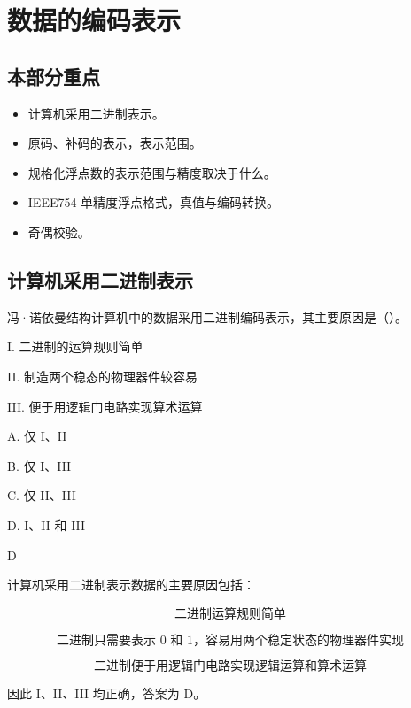 \section{数据的编码表示}

\subsection*{本部分重点}
\begin{itemize}
    \item 计算机采用二进制表示。
    \item 原码、补码的表示，表示范围。
    \item 规格化浮点数的表示范围与精度取决于什么。
    \item IEEE754 单精度浮点格式，真值与编码转换。
    \item 奇偶校验。
\end{itemize}

\subsection{计算机采用二进制表示}

\begin{question}
冯·诺依曼结构计算机中的数据采用二进制编码表示，其主要原因是（）。

I. 二进制的运算规则简单

II. 制造两个稳态的物理器件较容易

III. 便于用逻辑门电路实现算术运算

A. 仅 I、II

B. 仅 I、III

C. 仅 II、III

D. I、II 和 III
\end{question}

\begin{answer}
D
\end{answer}

\begin{analysisenv}
计算机采用二进制表示数据的主要原因包括：

\[
\text{二进制运算规则简单}
\]

\[
\text{二进制只需要表示 }0\text{ 和 }1\text{，容易用两个稳定状态的物理器件实现}
\]

\[
\text{二进制便于用逻辑门电路实现逻辑运算和算术运算}
\]

因此 I、II、III 均正确，答案为 D。
\end{analysisenv}


